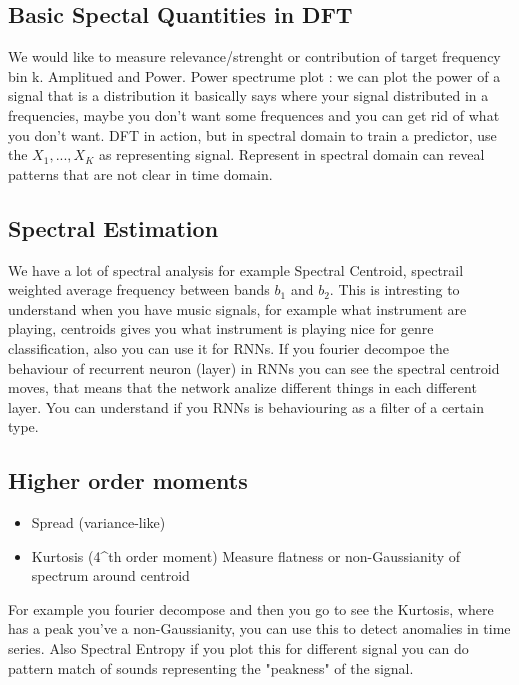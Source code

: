 \documentclass[12pt]{book}
\begin{document}
\subsection{Basic Spectal Quantities in DFT}
We would like to measure relevance/strenght or contribution of target frequency bin k.
\newline\newline
Amplitued and Power.
\newline
Power spectrume plot : we can plot the power of a signal that is a distribution it basically says where your signal distributed in a frequencies, maybe you don't want some frequences and you can get rid of what you don't want.
\newline
DFT in action, but in spectral domain to train a predictor, use the $X_1,...,X_K$ as representing signal.\newline
Represent in spectral domain can reveal patterns that are not clear in time domain.

\subsection{Spectral Estimation}
We have a lot of spectral analysis for example Spectral Centroid, spectrail weighted average frequency between bands $b_1$ and $b_2$.
This is intresting to understand when you have music signals, for example what instrument are playing, centroids gives you what instrument is playing nice for genre classification, also you can use it for RNNs.
If you fourier decompoe the behaviour of recurrent neuron (layer) in RNNs you can see the spectral centroid moves, that means that the network analize different things in each different layer. You can understand if you RNNs is behaviouring as a filter of a certain type.\newline

\subsection{Higher order moments}

\begin{itemize}
	\item Spread (variance-like)
	\item Kurtosis (4^th order moment) Measure flatness or non-Gaussianity of spectrum around centroid
\end{itemize}
\newline\newline
For example you fourier decompose and then you go to see the Kurtosis, where has a peak you've a non-Gaussianity, you can use this to detect anomalies in time series.\newline
Also Spectral Entropy if you plot this for different signal you can do pattern match of sounds representing the "peakness" of the signal.
\end{document}
